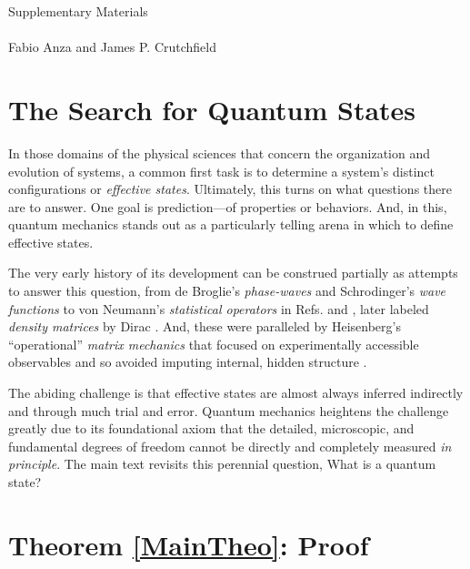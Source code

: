 \documentclass[draft,nofootinbib,pre,twocolumn,showpacs,showkeys,preprintnumbers,floatfix]{revtex4-1}
\newcommand{\1}{\mathbbm{1}}
\begin{document}


\makeatletter
\newcommand{\manuallabel}[2]{\def\@currentlabel{#2}\label{#1}}
\makeatother

\clearpage
\appendix
\onecolumngrid

\pagestyle{empty}

\begin{center}
\large{Supplementary Materials}\\
\vspace{0.1in}
\emph{\ourTitle}\\
\vspace{0.1in}
{\small
Fabio Anza and James P. Crutchfield
}
\end{center}

\section{The Search for Quantum States}
\label{sm:QStates}

In those domains of the physical sciences that concern the organization and
evolution of systems, a common first task is to determine a system's distinct
configurations or \emph{effective states}. Ultimately, this turns on what
questions there are to answer. One goal is prediction---of properties or
behaviors. And, in this, quantum mechanics stands out as a particularly telling
arena in which to define effective states.

The very early history of its development can be construed partially as
attempts to answer this question, from de Broglie's \emph{phase-waves}
\cite{Brog25a} and Schrodinger's \emph{wave functions} \cite{Schr26a} to von
Neumann's \emph{statistical operators} in Refs. \cite{Neum27a} and \cite[Chap.
IV]{Neum32a}, later labeled \emph{density matrices} by Dirac
\cite{Dira29a,Dira30b,Dira31a}. And, these were paralleled by Heisenberg's
``operational'' \emph{matrix mechanics} that focused on experimentally
accessible observables and so avoided imputing internal, hidden structure
\cite{Heis25a}.

The abiding challenge is that effective states are almost always inferred
indirectly and through much trial and error. Quantum mechanics heightens the
challenge greatly due to its foundational axiom that the detailed, microscopic,
and fundamental degrees of freedom cannot be directly and completely measured
\emph{in principle}. The main text revisits this perennial question, What is a
quantum state?

\section{Theorem \ref{MainTheo}: Proof}
\label{sm:MainTheo}
\end{document}
